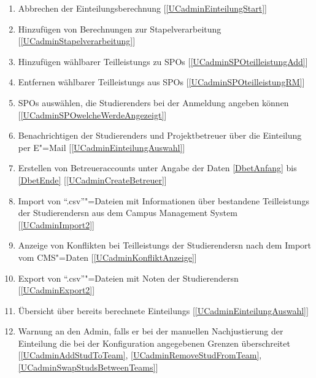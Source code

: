 \documentclass[parskip=full]{scrartcl}
\newcommand{\swtLabel}[1]{\textbf{/#1\arabic*0/}}
\newcommand{\testRef}[1]{[\ref{#1}]}
\begin{document}
\begin{enumerate}[label=\swtLabel{FA}, resume]
  \item Abbrechen der \gls{Einteilung}sberechnung \label{FAabbruch} \testRef{UCadminEinteilungStart}
  \item Hinzufügen von Berechnungen zur Stapelverarbeitung \label{FAadminStapel}
  \testRef{UCadminStapelverarbeitung}
  \item Hinzufügen wählbarer \glspl{Teilleistung} zu \glspl{SPO}
  \label{FAadminSPOhinzufügen} \testRef{UCadminSPOteilleistungAdd}
  \item Entfernen wählbarer \glspl{Teilleistung} aus \glspl{SPO}
  \label{FAadminSPOentfernen} \testRef{UCadminSPOteilleistungRM}
  \item \glspl{SPO} auswählen, die \glspl{Studierender} bei der Anmeldung angeben können
  \label{FAadminSPOAuswahl} \testRef{UCadminSPOwelcheWerdeAngezeigt}
  \item Benachrichtigen der \glspl{Studierender} und \gls{Projektbetreuer} über die \gls{Einteilung}
  per E"=Mail \label{FAadminBenachrichtigen} \testRef{UCadminEinteilungAuswahl}
  \item Erstellen von Betreueraccounts unter Angabe der Daten \ref{DbetAnfang}
  bis \ref{DbetEnde}
  \label{FAadminCreateAccounts}
  \testRef{UCadminCreateBetreuer}
  \item Import von \enquote{.csv}"=Dateien mit Informationen über bestandene
  \glspl{Teilleistung} der \glspl{Studierender}n aus dem Campus Management System 
  \label{FAimport2} \testRef{UCadminImport2}
  \item Anzeige von Konflikten bei \glspl{Teilleistung} der \glspl{Studierender}n nach dem Import vom \gls{CMS}"=Daten 
  \label{FAkonfliktAnzeige} \testRef{UCadminKonfliktAnzeige}
  \item Export von \enquote{.csv}"=Dateien mit Noten der \glspl{Studierender}n
  \label{FAexport2} \testRef{UCadminExport2}
  \item Übersicht über bereits berechnete \glspl{Einteilung}
  \label{FAadminUebersichtAlleEinteilungen} \testRef{UCadminEinteilungAuswahl}
  \item Warnung an den \gls{Admin}, falls er bei der manuellen Nachjustierung 
  der \gls{Einteilung} die bei der Konfiguration angegebenen Grenzen überschreitet
  \label{FAadminWarnung} [\ref{UCadminAddStudToTeam},
  \ref{UCadminRemoveStudFromTeam}, \ref{UCadminSwapStudsBetweenTeams}]
\end{enumerate}
\end{document}
